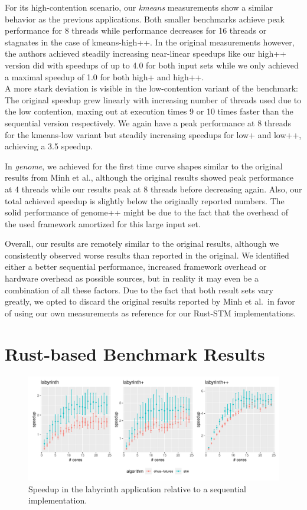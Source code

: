 For its high-contention scenario, our \emph{kmeans} measurements show a similar behavior as the previous applications.
Both smaller benchmarks achieve peak performance for 8 threads while performance decreases for 16 threads or stagnates in the case of kmeans-high++.
In the original measurements however, the authors achieved steadily increasing near-linear speedups like our high++ version did with speedups of up to 4.0 for both input sets while we only achieved a maximal speedup of 1.0 for both high+ and high++.\\
A more stark deviation is visible in the low-contention variant of the benchmark:
The original speedup grew linearly with increasing number of threads used due to the low contention, maxing out at execution times 9 or 10 times faster than the sequential version respectively.
We again have a peak performance at 8 threads for the kmeans-low variant but steadily increasing speedups for low+ and low++, achieving a 3.5 speedup.

In \emph{genome}, we achieved for the first time curve shapes similar to the original results from Minh et al., although the original results showed peak performance at 4 threads while our results peak at 8 threads before decreasing again.
Also, our total achieved speedup is slightly below the originally reported numbers.
The solid performance of genome++ might be due to the fact that the overhead of the used framework amortized for this large input set.

Overall, our results are remotely similar to the original results, although we consistently observed worse results than reported in the original.
We identified either a better sequential performance, increased framework overhead or hardware overhead as possible sources, but in reality it may even be a combination of all these factors.
Due to the fact that both result sets vary greatly, we opted to discard the original results reported by Minh et al.\ in favor of using our own measurements as reference for our Rust-STM implementations.


\section{Rust-based Benchmark Results}

\begin{figure}
    \centering
    \includegraphics[width=\textwidth,keepaspectratio]{gfx/results/labyrinth_comb}
    \caption{Speedup in the labyrinth application relative to a sequential implementation.}%
    \label{fig:evaluation:labyrinth}
\end{figure}

